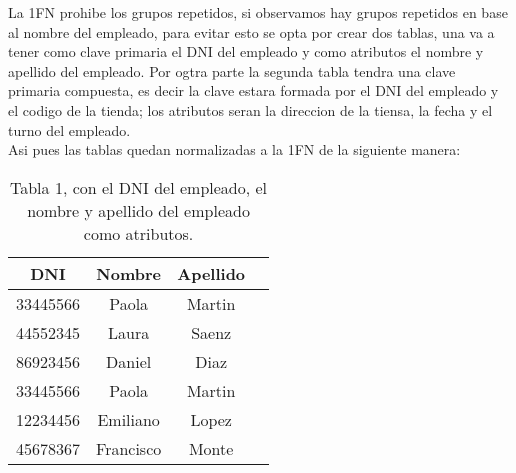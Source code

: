 \documentclass[spanish]{article}
\begin{document}
	
	La 1FN prohibe los grupos repetidos, si observamos hay grupos repetidos en base al nombre del empleado, para evitar esto se opta por crear dos tablas, una va a tener como clave primaria el DNI del empleado y como atributos el nombre y apellido del empleado. Por ogtra parte la segunda tabla tendra una clave primaria compuesta, es decir la clave estara formada por el DNI del empleado y el codigo de la tienda; los atributos seran la direccion de la tiensa, la fecha y el turno del empleado.\\
	
	Asi pues las tablas quedan normalizadas a la 1FN de la siguiente manera:\\
    
    
    
    
    
     \begin{table}[ht]
    \centering
	\begin{tabular}{|c|c|c|l|}
	\hline
	\rowcolor{LightBlue2}
	\textbf{DNI} & \textbf{Nombre} & \textbf{Apellido}\\ \hline
	 33445566 & Paola & Martin\\ \hline
	 44552345 & Laura & Saenz\\ \hline
	 86923456 & Daniel & Diaz\\ \hline
	 33445566 & Paola & Martin\\ \hline
	 12234456 & Emiliano & Lopez \\ \hline
	 45678367 & Francisco & Monte \\ \hline
	\end{tabular}
	\caption{Tabla 1, con el DNI del empleado, el nombre y apellido del empleado como atributos.} \label{tabla2}
	\end{table}
	
	
	
\end{document}
